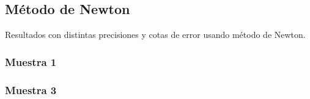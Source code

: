 \documentclass[a4paper,10pt,twoside]{article}
\begin{document}





\subsection{Método de Newton}
Resultados con distintas precisiones y cotas de error usando  método de Newton.

\subsubsection{Muestra 1}


\subsubsection{Muestra 3}


\end{document}
